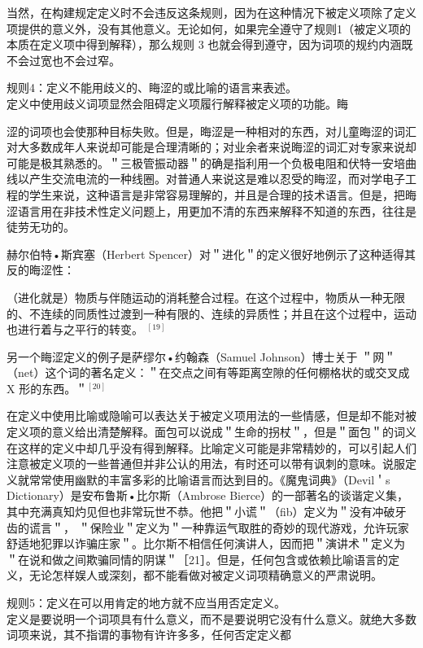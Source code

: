 当然，在构建规定定义时不会违反这条规则，因为在这种情况下被定义项除了定义项提供的意义外，没有其他意义。无论如何，如果完全遵守了规则1（被定义项的本质在定义项中得到解释），那么规则 3 也就会得到遵守，因为词项的规约内涵既不会过宽也不会过窄。

规则4：定义不能用歧义的、䀲涩的或比喻的语言来表述。\\
定义中使用歧义词项显然会阻碍定义项履行解释被定义项的功能。䀲

涩的词项也会使那种目标失败。但是，晦涩是一种相对的东西，对儿童晦涩的词汇对大多数成年人来说却可能是合理清晰的；对业余者来说晦涩的词汇对专家来说却可能是极其熟悉的。＂三极管振动器＂的确是指利用一个负极电阻和伏特一安培曲线以产生交流电流的一种线圈。对普通人来说这是难以忍受的䀲涩，而对学电子工程的学生来说，这种语言是非常容易理解的，并且是合理的技术语言。但是，把晦涩语言用在非技术性定义问题上，用更加不清的东西来解释不知道的东西，往往是徒劳无功的。

赫尔伯特•斯宾塞（Herbert Spencer）对＂进化＂的定义很好地例示了这种适得其反的晦涩性：

\begin{displayquote}
（进化就是）物质与伴随运动的消耗整合过程。在这个过程中，物质从一种无限的、不连续的同质性过渡到一种有限的、连续的异质性；并且在这个过程中，运动也进行着与之平行的转变。 ${ }^{[19]}$
\end{displayquote}

另一个䀲涩定义的例子是萨缪尔•约翰森（Samuel Johnson）博士关于 ＂网＂（net）这个词的著名定义：＂在交点之间有等距离空隙的任何棚格状的或交叉成 X 形的东西。＂${ }^{[20]}$

在定义中使用比喻或隐喻可以表达关于被定义项用法的一些情感，但是却不能对被定义项的意义给出清楚解释。面包可以说成＂生命的拐杖＂，但是＂面包＂的词义在这样的定义中却几乎没有得到解释。比喻定义可能是非常精妙的，可以引起人们注意被定义项的一些普通但并非公认的用法，有时还可以带有讽刺的意味。说服定义就常常使用幽默的丰富多彩的比喻语言而达到目的。《魔鬼词典》（Devil＇s Dictionary）是安布鲁斯•比尔斯（Ambrose Bierce）的一部著名的谈谐定义集，其中充满真知灼见但也非常玩世不恭。他把＂小谎＂（fib）定义为＂没有冲破牙齿的谎言＂， ＂保险业＂定义为＂一种靠运气取胜的奇妙的现代游戏，允许玩家舒适地犯罪以诈骗庄家＂。比尔斯不相信任何演讲人，因而把＂演讲术＂定义为 ＂在说和做之间欺骗同情的阴谋＂［21］。但是，任何包含或依赖比喻语言的定义，无论怎样娱人或深刻，都不能看做对被定义词项精确意义的严肃说明。

规则5：定义在可以用肯定的地方就不应当用否定定义。\\
定义是要说明一个词项具有什么意义，而不是要说明它没有什么意义。就绝大多数词项来说，其不指谓的事物有许许多多，任何否定定义都


